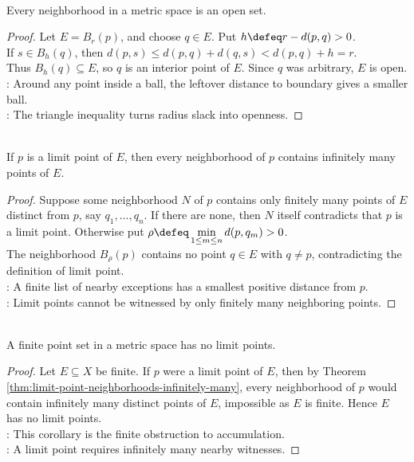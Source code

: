 \begin{theorem} \label{thm:every-neighborhood-open} \\
Every neighborhood in a metric space is an open set.
\begin{proof}
Let $E=B_r(p)$, and choose $q\in E$. Put $h\defeq r-d(p,q)>0$.\\
If $s\in B_h(q)$, then $d(p,s)\leq d(p,q)+d(q,s)<d(p,q)+h=r$.\\
Thus $B_h(q)\subseteq E$, so $q$ is an interior point of $E$. Since $q$ was arbitrary, $E$ is open.\\
: Around any point inside a ball, the leftover distance to boundary gives a smaller ball.\\
: The triangle inequality turns radius slack into openness.
\end{proof}
\end{theorem}

\begin{theorem} \label{thm:limit-point-neighborhoods-infinitely-many} \\
If $p$ is a limit point of $E$, then every neighborhood of $p$ contains infinitely many points of $E$.
\begin{proof}
Suppose some neighborhood $N$ of $p$ contains only finitely many points of $E$ distinct from $p$, say $q_1,\ldots,q_n$. If there are none, then $N$ itself contradicts that $p$ is a limit point. Otherwise put $\rho\defeq\min\limits_{1\leq m\leq n}d(p,q_m)>0$.\\
The neighborhood $B_\rho(p)$ contains no point $q\in E$ with $q\neq p$, contradicting the definition of limit point.\\
: A finite list of nearby exceptions has a smallest positive distance from $p$.\\
: Limit points cannot be witnessed by only finitely many neighboring points.
\end{proof}
\end{theorem}

\begin{corollary} \label{cor:finite-point-set-no-limit-points} \\
A finite point set in a metric space has no limit points.
\begin{proof}
Let $E\subseteq X$ be finite. If $p$ were a limit point of $E$, then by Theorem \ref{thm:limit-point-neighborhoods-infinitely-many}, every neighborhood of $p$ would contain infinitely many distinct points of $E$, impossible as $E$ is finite. Hence $E$ has no limit points.\\
: This corollary is the finite obstruction to accumulation.\\
: A limit point requires infinitely many nearby witnesses.
\end{proof}
\end{corollary}

